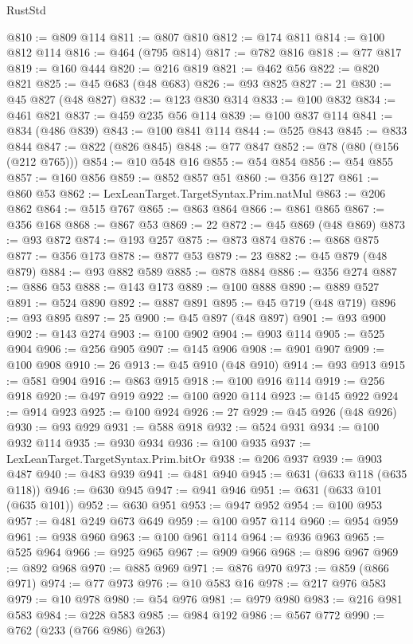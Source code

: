 \begin{lexlean}{RustStd}
\begin{coremodule}
@810 := @809 @114
@811 := @807 @810
@812 := @174 @811
@814 := @100 @812 @114
@816 := @464 (@795 @814)
@817 := @782 @816
@818 := @77 @817
@819 := @160 @444
@820 := @216 @819
@821 := @462 @56
@822 := @820 @821
@825 := @45 @683 (@48 @683)
@826 := @93 @825
@827 := 21
@830 := @45 @827 (@48 @827)
@832 := @123 @830 @314
@833 := @100 @832
@834 := @461 @821
@837 := @459 @235 @56 @114
@839 := @100 @837 @114
@841 := @834 (@486 @839)
@843 := @100 @841 @114
@844 := @525 @843
@845 := @833 @844
@847 := @822 (@826 @845)
@848 := @77 @847
@852 := @78 (@80 (@156 (@212 @765)))
@854 := @10 @548 @16
@855 := @54 @854
@856 := @54 @855
@857 := @160 @856
@859 := @852 @857 @51
@860 := @356 @127
@861 := @860 @53
@862 := LexLeanTarget.TargetSyntax.Prim.natMul
@863 := @206 @862
@864 := @515 @767
@865 := @863 @864
@866 := @861 @865
@867 := @356 @168
@868 := @867 @53
@869 := 22
@872 := @45 @869 (@48 @869)
@873 := @93 @872
@874 := @193 @257
@875 := @873 @874
@876 := @868 @875
@877 := @356 @173
@878 := @877 @53
@879 := 23
@882 := @45 @879 (@48 @879)
@884 := @93 @882 @589
@885 := @878 @884
@886 := @356 @274
@887 := @886 @53
@888 := @143 @173
@889 := @100 @888
@890 := @889 @527
@891 := @524 @890
@892 := @887 @891
@895 := @45 @719 (@48 @719)
@896 := @93 @895
@897 := 25
@900 := @45 @897 (@48 @897)
@901 := @93 @900
@902 := @143 @274
@903 := @100 @902
@904 := @903 @114
@905 := @525 @904
@906 := @256 @905
@907 := @145 @906
@908 := @901 @907
@909 := @100 @908
@910 := 26
@913 := @45 @910 (@48 @910)
@914 := @93 @913
@915 := @581 @904
@916 := @863 @915
@918 := @100 @916 @114
@919 := @256 @918
@920 := @497 @919
@922 := @100 @920 @114
@923 := @145 @922
@924 := @914 @923
@925 := @100 @924
@926 := 27
@929 := @45 @926 (@48 @926)
@930 := @93 @929
@931 := @588 @918
@932 := @524 @931
@934 := @100 @932 @114
@935 := @930 @934
@936 := @100 @935
@937 := LexLeanTarget.TargetSyntax.Prim.bitOr
@938 := @206 @937
@939 := @903 @487
@940 := @483 @939
@941 := @481 @940
@945 := @631 (@633 @118 (@635 @118))
@946 := @630 @945
@947 := @941 @946
@951 := @631 (@633 @101 (@635 @101))
@952 := @630 @951
@953 := @947 @952
@954 := @100 @953
@957 := @481 @249 @673 @649
@959 := @100 @957 @114
@960 := @954 @959
@961 := @938 @960
@963 := @100 @961 @114
@964 := @936 @963
@965 := @525 @964
@966 := @925 @965
@967 := @909 @966
@968 := @896 @967
@969 := @892 @968
@970 := @885 @969
@971 := @876 @970
@973 := @859 (@866 @971)
@974 := @77 @973
@976 := @10 @583 @16
@978 := @217 @976 @583
@979 := @10 @978
@980 := @54 @976
@981 := @979 @980
@983 := @216 @981 @583
@984 := @228 @583
@985 := @984 @192
@986 := @567 @772
@990 := @762 (@233 (@766 @986) @263)

\end{coremodule}
\end{lexlean}
